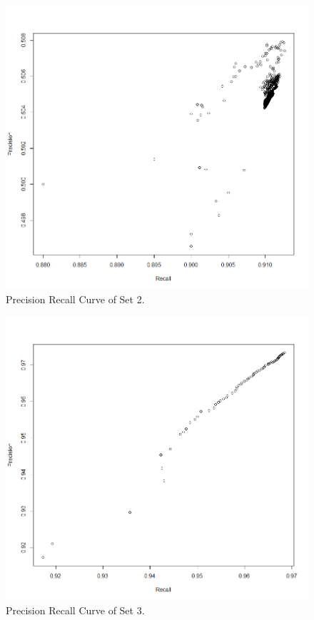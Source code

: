 \documentclass{scrartcl}
\begin{document}
\begin{figure}[ht]
\begin{center}
\includegraphics[scale=0.3]{PerceptronSet2.png}
\end{center}
\caption{Precision Recall Curve of Set 2.}
\label{Img:PrecisionRecallS1}
\end{figure}

\begin{figure}[ht]
\begin{center}
\includegraphics[scale=0.3]{PerceptronSet3.png}
\end{center}
\caption{Precision Recall Curve of Set 3.}
\label{Img:PrecisionRecallS1}
\end{figure}
\end{document}
